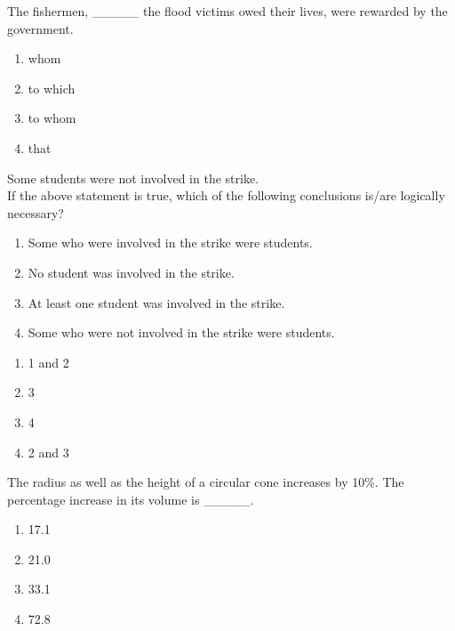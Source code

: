  \iffalse
    \title{Assignment}
    \author{EE24BTECH11035}
    \section{ae}
    \chapter{2019}
  \fi
    \item The fishermen, \_\_\_\_\_ the flood victims owed their lives, were rewarded by the government.
    \begin{enumerate}
        \item whom
        \item to which
        \item to whom
        \item that
    \end{enumerate}
    
    \item Some students were not involved in the strike. \\
    If the above statement is true, which of the following conclusions is/are logically necessary?
    \begin{enumerate}
        \item Some who were involved in the strike were students.
        \item No student was involved in the strike.
        \item At least one student was involved in the strike.
        \item Some who were not involved in the strike were students.
    \end{enumerate}
    \begin{enumerate}
        \item 1 and 2
        \item 3
        \item 4
        \item 2 and 3
    \end{enumerate}
    
    \item The radius as well as the height of a circular cone increases by 10\%. The percentage increase in its volume is \_\_\_\_\_.
    \begin{enumerate}
        \item 17.1
        \item 21.0
        \item 33.1
        \item 72.8
    \end{enumerate}
    
